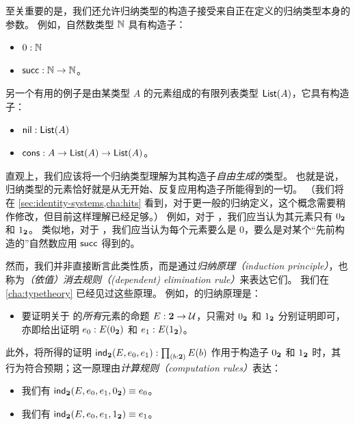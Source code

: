 至关重要的是，我们还允许归纳类型的构造子接受来自正在定义的归纳类型本身的参数。
例如，自然数类型 $\mathbb{N}$ 具有构造子：

\begin{itemize}
\item $0:\mathbb{N}$
\item $\mathsf{succ}:\mathbb{N}\to\mathbb{N}$。
\end{itemize}

%
%
另一个有用的例子是由某类型 $A$ 的元素组成的有限列表类型 $\mathsf{List}(A)$，它具有构造子：

\begin{itemize}\label{list_constructors}
\item $\mathsf{nil}:\mathsf{List}(A)$
\item $\mathsf{cons}:A\to \mathsf{List}(A) \to \mathsf{List}(A)$。
\end{itemize}

%
直观上，我们应该将一个归纳类型理解为其构造子\emph{自由生成的}类型。
也就是说，归纳类型的元素恰好就是从无开始、反复应用构造子所能得到的一切。
（我们将在 \cref{sec:identity-systems,cha:hits} 看到，对于更一般的归纳定义，这个概念需要稍作修改，但目前这样理解已经足够。）
例如，对于 \bool，我们应当认为其元素只有 ${0_{\mathbf{2}}}$ 和 ${1_{\mathbf{2}}}$。
类似地，对于 \nat，我们应当认为每个元素要么是 $0$，要么是对某个“先前构造的”自然数应用 $\mathsf{succ}$ 得到的。

%
然而，我们并非直接断言此类性质，而是通过\emph{归纳原理（induction principle）}，也称为\emph{（依值）消去规则（(dependent) elimination rule）}来表达它们。
我们在 \cref{cha:typetheory} 已经见过这些原理。
例如，\bool 的归纳原理是：
%

\begin{itemize}
\item 要证明关于 \bool 的\emph{所有}元素的命题 $E : \mathbf{2} \to \mathcal{U}$，只需对 ${0_{\mathbf{2}}}$ 和 ${1_{\mathbf{2}}}$ 分别证明即可，亦即给出证明 $e_0 : E({0_{\mathbf{2}}})$ 和 $e_1 : E({1_{\mathbf{2}}})$。
\end{itemize}

此外，将所得的证明 $\ind\bool(E,e_0,e_1): \prd{b : \bool}E(b)$ 作用于构造子 ${0_{\mathbf{2}}}$ 和 ${1_{\mathbf{2}}}$ 时，其行为符合预期；这一原理由\emph{计算规则（computation rules）}表达：

\begin{itemize}
\item 我们有 $\mathsf{ind}_{\mathbf{2}}(E,e_0,e_1,{0_{\mathbf{2}}}) \equiv e_0$。
\item 我们有 $\mathsf{ind}_{\mathbf{2}}(E,e_0,e_1,{1_{\mathbf{2}}}) \equiv e_1$。
\end{itemize}

